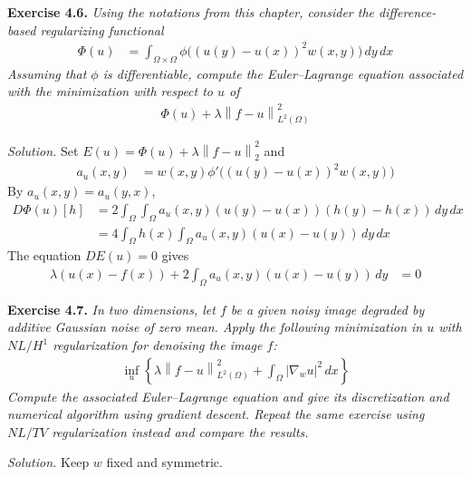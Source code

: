 \documentclass[12pt,letterpaper]{article}
\newcommand{\norm}[1]{\left\lVert #1\right\rVert}
\newcommand{\exercise}[1]{%
  \par\bigskip\noindent\textbf{Exercise #1.}\enspace}
\newenvironment{statement}{\itshape\ignorespaces}{\par}
\newcommand{\solution}{\par\medskip\noindent\textit{Solution.}\enspace}
\begin{document}
\clearpage
\begin{samepage}
\exercise{4.6}
\begin{statement}
Using the notations from this chapter, consider the difference-based
regularizing functional
\begin{align*}
 \Phi(u)&=\int_{\Omega\times\Omega}
 \phi\bigl((u(y)-u(x))^2w(x,y)\bigr)\,dy\,dx
\end{align*}
Assuming that $\phi$ is differentiable, compute the Euler--Lagrange
equation associated with the minimization with respect to $u$ of
\begin{align*}
 \Phi(u)+\lambda\norm{f-u}_{L^2(\Omega)}^2
\end{align*}
\end{statement}
\end{samepage}
\solution
Set $E(u)=\Phi(u)+\lambda\norm{f-u}_2^2$ and
\begin{align*}
 a_u(x,y)&=w(x,y)\phi'\bigl((u(y)-u(x))^2w(x,y)\bigr)
\end{align*}
By $a_u(x,y)=a_u(y,x)$,
\begin{align*}
 D\Phi(u)[h]
 &=2\int_\Omega\int_\Omega
   a_u(x,y)(u(y)-u(x))(h(y)-h(x))\,dy\,dx\\
 &=4\int_\Omega h(x)\int_\Omega
   a_u(x,y)(u(x)-u(y))\,dy\,dx
\end{align*}
The equation $DE(u)=0$ gives
\begin{align*}
 \lambda(u(x)-f(x))
 +2\int_\Omega a_u(x,y)(u(x)-u(y))\,dy&=0
 \tag*{$\square$}
\end{align*}

\clearpage
\exercise{4.7}
\begin{statement}
In two dimensions, let $f$ be a given noisy image degraded by additive
Gaussian noise of zero mean. Apply the following minimization in $u$
with $NL/H^1$ regularization for denoising the image $f$:
\begin{align*}
 \inf_u\left\{\lambda\norm{f-u}_{L^2(\Omega)}^2
       +\int_\Omega|\nabla_wu|^2\,dx\right\}
\end{align*}
Compute the associated Euler--Lagrange equation and give its discretization
and numerical algorithm using gradient descent. Repeat the same exercise
using $NL/TV$ regularization instead and compare the results.
\end{statement}
\solution
Keep $w$ fixed and symmetric.
\end{document}
